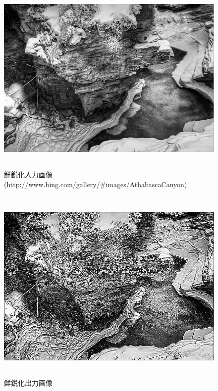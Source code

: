 \documentclass[11pt,a4j]{jsarticle}
\begin{document}
    \begin{figure}[H]
      \centering
      \includegraphics[clip,width=12.0cm ,height= 9.6cm]{./img/sharpened/sharpened_source.png}
      \caption{鮮鋭化入力画像(http://www.bing.com/gallery/\#images/AthabascaCanyon)\label{fig:sharpened_source}}
    \end{figure}
    \begin{figure}[H]
      \centering
      \includegraphics[clip,width=12.0cm ,height= 9.6cm]{./img/sharpened/sharpened.png}
      \caption{鮮鋭化出力画像\label{fig:sharpened_result}}
    \end{figure}
\end{document}
